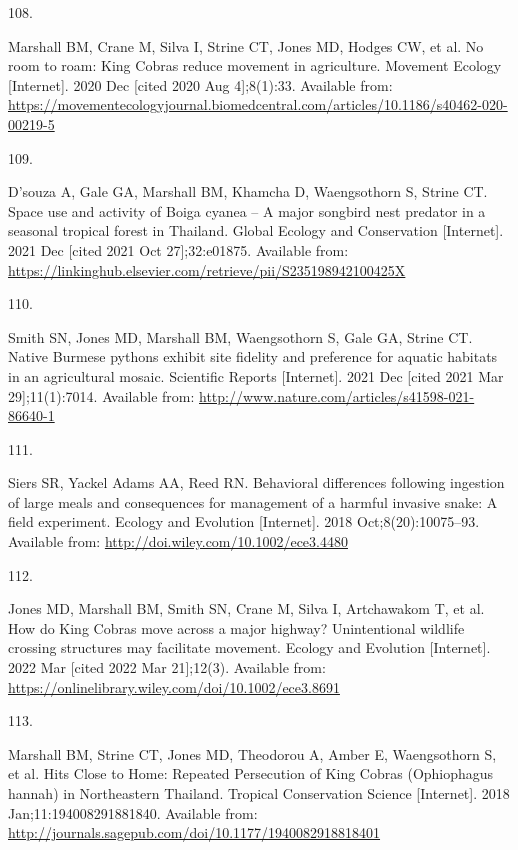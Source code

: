 \documentclass[10pt,a4paper]{article}
\newlength{\cslhangindent}
\newlength{\csllabelwidth}
\newenvironment{CSLReferences}[2] %
{\begin{list}{}{%
	\setlength{\itemindent}{0pt}
	\setlength{\leftmargin}{0pt}
	\setlength{\parsep}{0pt}
	\ifodd #1
	\setlength{\leftmargin}{\cslhangindent}
	\setlength{\itemindent}{-1\cslhangindent}
	\fi
	\setlength{\itemsep}{#2\baselineskip}}}
{\end{list}}
\newcommand{\CSLLeftMargin}[1]{\parbox[t]{\csllabelwidth}{\strut#1\strut}}
\newcommand{\CSLRightInline}[1]{\parbox[t]{\linewidth - \csllabelwidth}{\strut#1\strut}}
\begin{document}
\begin{CSLReferences}{0}{1}
\CSLLeftMargin{108. }%
\CSLRightInline{Marshall BM, Crane M, Silva I, Strine CT, Jones MD, Hodges CW, et al. No room to roam: {King} {Cobras} reduce movement in agriculture. Movement Ecology {[}Internet{]}. 2020 Dec {[}cited 2020 Aug 4{]};8(1):33. Available from: \url{https://movementecologyjournal.biomedcentral.com/articles/10.1186/s40462-020-00219-5}}

\CSLLeftMargin{109. }%
\CSLRightInline{D'souza A, Gale GA, Marshall BM, Khamcha D, Waengsothorn S, Strine CT. Space use and activity of {Boiga} cyanea -- {A} major songbird nest predator in a seasonal tropical forest in {Thailand}. Global Ecology and Conservation {[}Internet{]}. 2021 Dec {[}cited 2021 Oct 27{]};32:e01875. Available from: \url{https://linkinghub.elsevier.com/retrieve/pii/S235198942100425X}}

\CSLLeftMargin{110. }%
\CSLRightInline{Smith SN, Jones MD, Marshall BM, Waengsothorn S, Gale GA, Strine CT. Native {Burmese} pythons exhibit site fidelity and preference for aquatic habitats in an agricultural mosaic. Scientific Reports {[}Internet{]}. 2021 Dec {[}cited 2021 Mar 29{]};11(1):7014. Available from: \url{http://www.nature.com/articles/s41598-021-86640-1}}

\CSLLeftMargin{111. }%
\CSLRightInline{Siers SR, Yackel Adams AA, Reed RN. Behavioral differences following ingestion of large meals and consequences for management of a harmful invasive snake: {A} field experiment. Ecology and Evolution {[}Internet{]}. 2018 Oct;8(20):10075--93. Available from: \url{http://doi.wiley.com/10.1002/ece3.4480}}

\CSLLeftMargin{112. }%
\CSLRightInline{Jones MD, Marshall BM, Smith SN, Crane M, Silva I, Artchawakom T, et al. How do {King} {Cobras} move across a major highway? {Unintentional} wildlife crossing structures may facilitate movement. Ecology and Evolution {[}Internet{]}. 2022 Mar {[}cited 2022 Mar 21{]};12(3). Available from: \url{https://onlinelibrary.wiley.com/doi/10.1002/ece3.8691}}

\CSLLeftMargin{113. }%
\CSLRightInline{Marshall BM, Strine CT, Jones MD, Theodorou A, Amber E, Waengsothorn S, et al. Hits {Close} to {Home}: {Repeated} {Persecution} of {King} {Cobras} ({Ophiophagus} hannah) in {Northeastern} {Thailand}. Tropical Conservation Science {[}Internet{]}. 2018 Jan;11:194008291881840. Available from: \url{http://journals.sagepub.com/doi/10.1177/1940082918818401}}


\end{CSLReferences}
\end{document}
